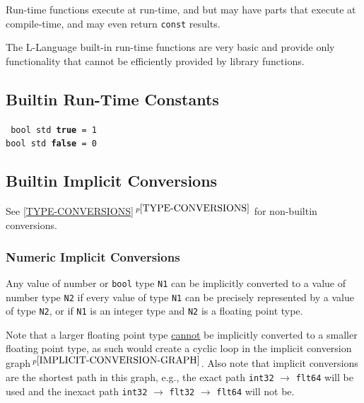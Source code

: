 \documentclass[12pt]{article}
\newcommand{\ttkey}[1]{{\tt \bfseries #1}}
\newcommand{\itemref}[1]{\ref{#1}$\,^{p\pageref{#1}}$}
\newcommand{\pagnote}[1]{$\,^{p\pageref{#1}}$}
\newenvironment{indpar}[1][0.3in]%
	{\begin{list}{}%
		     {\setlength{\itemsep}{0in}%
		      \setlength{\topsep}{0in}%
		      \setlength{\parsep}{1ex}%
		      \setlength{\labelwidth}{#1}%
		      \setlength{\leftmargin}{#1}%
		      \addtolength{\leftmargin}{\labelsep}}%
	 \item}%
	{\end{list}}
\begin{document}
Run-time functions execute at run-time, and but may have
parts that execute at compile-time, and may even return
{\tt const} results.

The L-Language built-in run-time functions are very basic
and provide only functionality that cannot be efficiently
provided by library functions.

\subsection{Builtin Run-Time Constants}
\label{BUILTIN-RUN-TIME-CONSTANTS}

\begin{indpar} \tt
bool std \ttkey{true} = 1 \\
bool std \ttkey{false} = 0
\end{indpar}


\subsection{Builtin Implicit Conversions}
\label{BUILTIN-IMPLICIT-CONVERSIONS}

See \itemref{TYPE-CONVERSIONS} for non-builtin conversions.


\subsubsection{Numeric Implicit Conversions}
\label{NUMERIC-IMPLICIT-CONVERSIONS}

Any value of number or {\tt bool} type {\tt N1}
can be implicitly converted to a value
of number type {\tt N2} if every value of type {\tt N1} can be
precisely represented by a value of type {\tt N2}, or if {\tt N1} is
an integer type and {\tt N2}
is a floating point type.

Note that a larger floating point type
\underline{cannot} be implicitly converted to a smaller floating point type,
as such would create a cyclic loop in the
implicit conversion graph\pagnote{IMPLICIT-CONVERSION-GRAPH}.
Also note that implicit conversions are the shortest path in this
graph, e.g., the exact path {\tt int32} $\rightarrow$ {\tt flt64}
will be used and the inexact path
{\tt int32} $\rightarrow$ {\tt flt32} $\rightarrow$ {\tt flt64} will not be.
\end{document}
